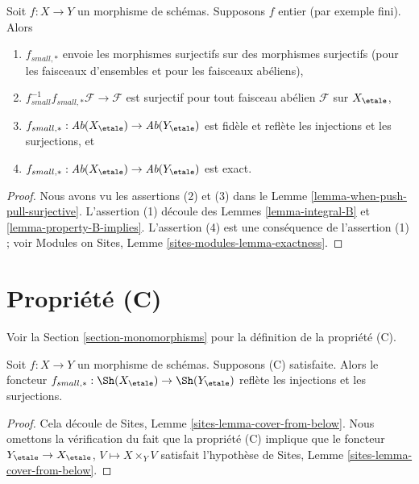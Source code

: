 \begin{lemma}
\label{lemma-what-integral}
Soit $f : X \to Y$ un morphisme de sch\'emas.
Supposons $f$ entier (par exemple fini).
Alors
\begin{enumerate}
\item $f_{small, *}$ envoie les morphismes surjectifs sur des morphismes surjectifs (pour les faisceaux
d'ensembles et pour les faisceaux ab\'eliens),
\item $f_{small}^{-1}f_{small, *}\mathcal{F} \to \mathcal{F}$
est surjectif pour tout faisceau ab\'elien $\mathcal{F}$ sur $X_\etale$,
\item
$f_{small, *} :
\textit{Ab}(X_\etale)
\to
\textit{Ab}(Y_\etale)$
est fid\`ele et refl\`ete les injections et les surjections, et
\item
$f_{small, *} :
\textit{Ab}(X_\etale)
\to
\textit{Ab}(Y_\etale)$
est exact.
\end{enumerate}
\end{lemma}

\begin{proof}
Nous avons vu les assertions (2) et (3) dans le
Lemme \ref{lemma-when-push-pull-surjective}.
L'assertion (1) d\'ecoule des
Lemmes \ref{lemma-integral-B} et \ref{lemma-property-B-implies}.
L'assertion (4) est une cons\'equence de l'assertion (1) ; voir
Modules on Sites, Lemme \ref{sites-modules-lemma-exactness}.
\end{proof}








\section{Propri\'et\'e (C)}
\label{section-C}

\noindent
Voir la Section \ref{section-monomorphisms} pour la d\'efinition de la propri\'et\'e
(C).

\begin{lemma}
\label{lemma-property-C-implies}
Soit $f : X \to Y$ un morphisme de sch\'emas. Supposons (C) satisfaite. Alors le foncteur
$f_{small, *} :
\Sh(X_\etale)
\to
\Sh(Y_\etale)$
refl\`ete les injections et les surjections.
\end{lemma}

\begin{proof}
Cela d\'ecoule de
Sites, Lemme \ref{sites-lemma-cover-from-below}.
Nous omettons la v\'erification du fait que la propri\'et\'e (C) implique que le foncteur
$Y_\etale \to X_\etale$, $V \mapsto X \times_Y V$
satisfait l'hypoth\`ese de
Sites, Lemme \ref{sites-lemma-cover-from-below}.
\end{proof}

